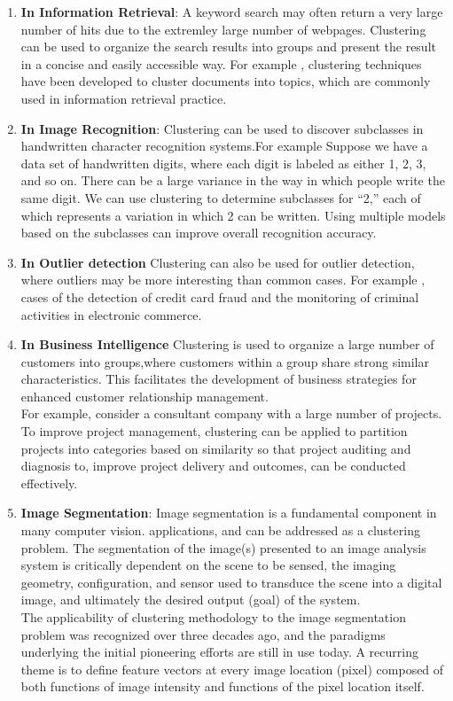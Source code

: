 \documentclass[letterpaper, 10 pt, conference]{ieeeconf}  %
\begin{document}
\begin{enumerate}
\item \textbf{In Information Retrieval}: 
A keyword search may often return a very large number of hits due to the extremley large number of webpages. Clustering can be used to organize the search results into groups and present the result in a concise and easily accessible way. For example , clustering techniques have been developed to cluster documents into topics, which are commonly used in information retrieval practice.\\
\item \textbf{In Image Recognition}:
Clustering can be used to discover subclasses in handwritten character recognition systems.For example Suppose we have a data set of handwritten digits, where each digit is labeled as either 1, 2, 3, and so on. There can be a large variance in the way in which people write the same digit. We can use clustering to determine subclasses for “2,” each of which
represents a variation  in which 2 can be written. Using multiple models based on the subclasses can improve overall recognition accuracy.\\
\item \textbf{In Outlier detection}
Clustering can also be used for outlier detection, where outliers  may be more interesting than common cases. For example , cases of  the detection of credit card fraud and the monitoring of criminal activities in electronic commerce.\\
\item \textbf{In Business Intelligence}
Clustering is used to organize a large number of customers into groups,where customers within a group share strong similar characteristics. This facilitates the development of business strategies for enhanced customer relationship management.\\
For example, consider a consultant company with a large number of projects. To improve project management, clustering can be applied to partition projects into categories based on similarity so that project auditing and diagnosis to, improve project delivery and outcomes, can be conducted effectively.\\
\item \textbf{Image Segmentation}: Image segmentation is a fundamental component in many computer vision. applications, and can be addressed as a clustering problem. The segmentation of the image(s) presented to an image analysis system is critically dependent on the scene to be sensed, the imaging geometry, configuration, and sensor used to transduce the scene into a digital image, and ultimately the desired output (goal) of the system.\\
The applicability of clustering methodology to the image segmentation problem was recognized over three decades ago, and the paradigms underlying the initial pioneering efforts are still in use today. A recurring theme is to define feature vectors at every image location (pixel) composed of both functions of image intensity and functions of the pixel location itself.
\end{enumerate}
\end{document}
